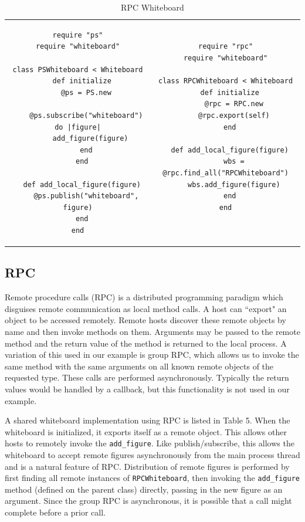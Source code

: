 \begin{table}
\centering
\begin{tabular}{c c}
\begin{minipage}{2.75in}
\begin{verbatim}
require "ps"
require "whiteboard"

class PSWhiteboard < Whiteboard
  def initialize
    @ps = PS.new
    
    @ps.subscribe("whiteboard") do |figure|
      add_figure(figure)
    end
  end

  def add_local_figure(figure)
    @ps.publish("whiteboard", figure)
  end
end
\end{verbatim}
\caption{Publish/Subscribe Whiteboard}\label{fig:pswb}
\end{minipage}
&
\begin{minipage}{2.5in}
\begin{verbatim}
require "rpc"
require "whiteboard"

class RPCWhiteboard < Whiteboard
  def initialize
    @rpc = RPC.new
    @rpc.export(self)
  end

  def add_local_figure(figure)
    wbs = @rpc.find_all("RPCWhiteboard")
    wbs.add_figure(figure)
  end
end


\end{verbatim}
\caption{RPC Whiteboard}\label{fig:rpcwb}
\end{minipage}
\end{tabular}
\end{table}


\subsection{RPC}

Remote procedure calls (RPC) is a distributed programming paradigm which disguises remote communication as local method calls. A host can ``export" an object to be accessed remotely. Remote hosts discover these remote objects by name and then invoke methods on them. Arguments may be passed to the remote method and the return value of the method is returned to the local process. A variation of this used in our example is group RPC, which allows us to invoke the same method with the same arguments on all known remote objects of the requested type. These calls are performed asynchronously. Typically the return values would be handled by a callback, but this functionality is not used in our example.

A shared whiteboard implementation using RPC is listed in Table 5. When the whiteboard is initialized, it exports itself as a remote object. This allows other hosts to remotely invoke the \texttt{add\_figure}. Like publish/subscribe, this allows the whiteboard to accept remote figures asynchronously from the main process thread and is a natural feature of RPC. Distribution of remote figures is performed by first finding all remote instances of \texttt{RPCWhiteboard}, then invoking the \texttt{add\_figure} method (defined on the parent class) directly, passing in the new figure as an argument. Since the group RPC is asynchronous, it is possible that a call might complete before a prior call.

